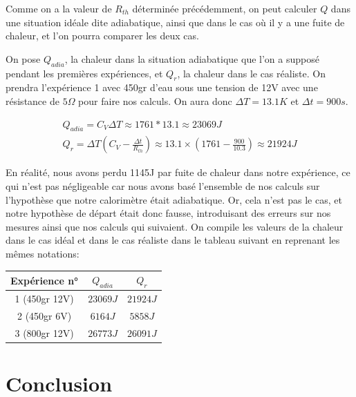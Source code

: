 \documentclass[12pt]{article}
\begin{document}
\newpage
Comme on a la valeur de $R_{th}$ déterminée précédemment, on peut calculer $Q$ dans une situation idéale dite adiabatique, ainsi que dans le cas où il y a une fuite de chaleur, et l'on pourra comparer les deux cas.

On pose $Q_{adia}$, la chaleur dans la situation adiabatique que l'on a supposé pendant les premières expériences, et $Q_{r}$, la chaleur dans le cas réaliste.
On prendra l'expérience 1 avec 450gr d'eau sous une tension de 12V avec une résistance de $5\Omega$ pour faire nos calculs. On aura donc $\Delta T = 13.1K$ et $\Delta t = 900s$.

\begin{gather}
	Q_{adia} = C_V \Delta T \approx 1761 * 13.1  \approx 23069 J \\
	Q_{r} = \Delta T \left( C_V - \frac{\Delta t}{R_{th}} \right) \approx 13.1 \times (1761 - \frac{900}{10.3}) \approx 21924 J
\end{gather}

En réalité, nous avons perdu 1145J par fuite de chaleur dans notre expérience, ce qui n'est pas négligeable car nous avons basé l'ensemble de nos calculs
sur l'hypothèse que notre calorimètre était adiabatique. Or, cela n'est pas le cas, et notre hypothèse de départ était donc fausse, introduisant des erreurs sur nos mesures
ainsi que nos calculs qui suivaient. On compile les valeurs de la chaleur dans le cas idéal et dans le cas réaliste dans le tableau suivant en reprenant les mêmes notations:

\begin{table}[h!]
	\begin{center}
		\begin{tabular}{|c|c|c|}
			\hline
			Expérience n° & $Q_{adia}$ & $Q_{r}$ \\ \hline
			1 (450gr 12V) & $23069J$ & $21924J$ \\
			2 (450gr 6V) & $6164J$ & $5858J$ \\
			3 (800gr 12V) & $26773J$ & $26091J$ \\ \hline
		\end{tabular}
	\end{center}
\end{table}

\section{Conclusion}
\end{document}
